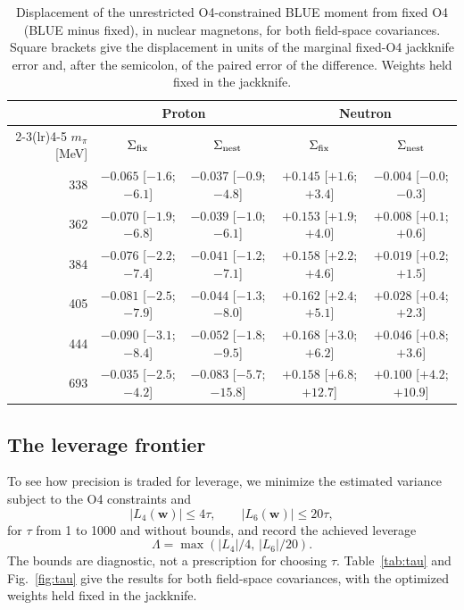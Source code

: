 \documentclass[aps,prd,preprint,nofootinbib,floatfix]{revtex4-2}
\begin{document}
\begin{table}[t]
\caption{Displacement of the unrestricted O4-constrained BLUE moment from fixed O4 (BLUE minus fixed), in nuclear magnetons, for both field-space covariances. Square brackets give the displacement in units of the marginal fixed-O4 jackknife error and, after the semicolon, of the paired error of the difference. Weights held fixed in the jackknife.}
\label{tab:displacement}
\centering
\begin{tabular}{rcccc}
\toprule
& \multicolumn{2}{c}{Proton} & \multicolumn{2}{c}{Neutron}\\
\cmidrule(lr){2-3}\cmidrule(lr){4-5}
$m_\pi$ [MeV] & $\Sigma_{\rm fix}$ & $\Sigma_{\rm nest}$ & $\Sigma_{\rm fix}$ & $\Sigma_{\rm nest}$\\
\midrule
338 & $-0.065$ [$-1.6$; $-6.1$] & $-0.037$ [$-0.9$; $-4.8$] & $+0.145$ [$+1.6$; $+3.4$] & $-0.004$ [$-0.0$; $-0.3$] \\
362 & $-0.070$ [$-1.9$; $-6.8$] & $-0.039$ [$-1.0$; $-6.1$] & $+0.153$ [$+1.9$; $+4.0$] & $+0.008$ [$+0.1$; $+0.6$] \\
384 & $-0.076$ [$-2.2$; $-7.4$] & $-0.041$ [$-1.2$; $-7.1$] & $+0.158$ [$+2.2$; $+4.6$] & $+0.019$ [$+0.2$; $+1.5$] \\
405 & $-0.081$ [$-2.5$; $-7.9$] & $-0.044$ [$-1.3$; $-8.0$] & $+0.162$ [$+2.4$; $+5.1$] & $+0.028$ [$+0.4$; $+2.3$] \\
444 & $-0.090$ [$-3.1$; $-8.4$] & $-0.052$ [$-1.8$; $-9.5$] & $+0.168$ [$+3.0$; $+6.2$] & $+0.046$ [$+0.8$; $+3.6$] \\
693 & $-0.035$ [$-2.5$; $-4.2$] & $-0.083$ [$-5.7$; $-15.8$] & $+0.158$ [$+6.8$; $+12.7$] & $+0.100$ [$+4.2$; $+10.9$] \\
\bottomrule
\end{tabular}
\end{table}

\subsection{The leverage frontier}
\label{sec:tau}

To see how precision is traded for leverage, we minimize the estimated variance subject to the O4 constraints and
\begin{equation}
|L_4(\bm w)|\le4\tau,\qquad |L_6(\bm w)|\le20\tau,
\label{eq:tau}
\end{equation}
for $\tau$ from 1 to 1000 and without bounds, and record the achieved leverage
\begin{equation}
\Lambda=\max(|L_4|/4,\,|L_6|/20).
\end{equation}
 The bounds are diagnostic, not a prescription for choosing $\tau$. Table~\ref{tab:tau} and Fig.~\ref{fig:tau} give the results for both field-space covariances, with the optimized weights held fixed in the jackknife.
\end{document}
